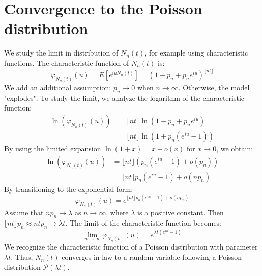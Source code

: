 \section{Convergence to the Poisson distribution}%
We study the limit in distribution of $N_n(t)$, for example using characteristic functions.
The characteristic function of $N_n(t)$ is:
\[ \varphi_{N_n(t)}(u) = E[e^{iu N_n(t)}] = (1 - p_n + p_n e^{iu})^{\lfloor nt \rfloor} \]
We add an additional assumption: $p_n \to 0$ when $n \to \infty$. Otherwise, the model "explodes".
To study the limit, we analyze the logarithm of the characteristic function:%
\begin{align*}
\ln(\varphi_{N_n(t)}(u)) &= \lfloor nt \rfloor \ln(1 - p_n + p_n e^{iu}) \\
&= \lfloor nt \rfloor \ln(1 + p_n(e^{iu} - 1))
\end{align*}%
By using the limited expansion $\ln(1+x) = x + o(x)$ for $x \to 0$, we obtain:%
\begin{align*}
\ln(\varphi_{N_n(t)}(u)) &= \lfloor nt \rfloor \left( p_n(e^{iu}-1) + o(p_n) \right) \\
&= \lfloor nt \rfloor p_n (e^{iu}-1) + o(n p_n)
\end{align*}%
By transitioning to the exponential form:
\[ \varphi_{N_n(t)}(u) = e^{\lfloor nt \rfloor p_n (e^{iu}-1) + o(n p_n)} \]
Assume that $np_n \to \lambda$ as $n \to \infty$, where $\lambda$ is a positive constant. Then $\lfloor nt \rfloor p_n \approx nt p_n \to \lambda t$.
The limit of the characteristic function becomes:
\[ \lim_{n \to \infty} \varphi_{N_n(t)}(u) = e^{\lambda t (e^{iu}-1)} \]
We recognize the characteristic function of a Poisson distribution with parameter $\lambda t$.
Thus, $N_n(t)$ converges in law to a random variable following a Poisson distribution $\mathcal{P}(\lambda t)$.
